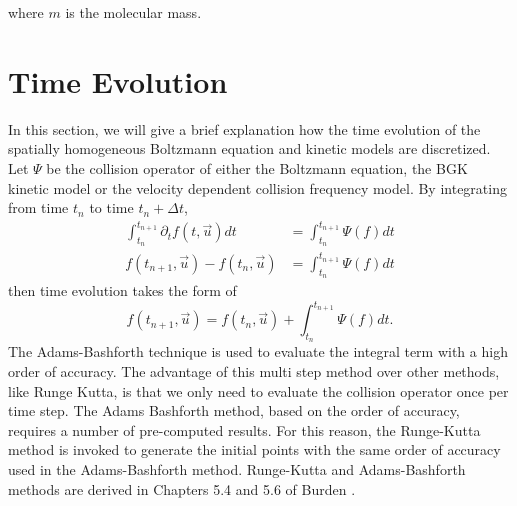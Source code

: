 %
where $m$ is the molecular mass.
\section{Time Evolution}
In this section, we will give a brief explanation how the time evolution of the spatially homogeneous Boltzmann equation and kinetic models are discretized. Let $\Psi$ be the collision operator of either the Boltzmann equation, the BGK kinetic model or the velocity dependent collision frequency model. By integrating from time $t_n$ to time $t_n + \Delta t$,
%
\begin{align*}
\int_{t_n}^{t_{n+1}} \partial_{t} f(t, \vec{u}) dt &= \int_{t_n}^{t_{n+1}} \Psi(f) dt\\
f(t_{n+1}, \vec{u}) - f(t_n, \vec{u}) &= \int_{t_n}^{t_{n+1}} \Psi(f) dt
\end{align*}
%
then time evolution takes the form of
%
\begin{equation*}
f(t_{n+1}, \vec{u}) = f(t_n, \vec{u}) + \int_{t_n}^{t_{n+1}} \Psi(f) dt.
\end{equation*}
%
The Adams-Bashforth technique is used to evaluate the integral term with a high order of accuracy. The advantage of this multi step method over other methods, like Runge Kutta, is that we only need to evaluate the collision operator once per time step. The Adams Bashforth method, based on the order of accuracy, requires a number of pre-computed results. For this reason, the Runge-Kutta method is invoked to generate the initial points with the same order of accuracy used in the Adams-Bashforth method. Runge-Kutta and Adams-Bashforth methods are derived in Chapters 5.4 and 5.6 of Burden \cite{burden}.
